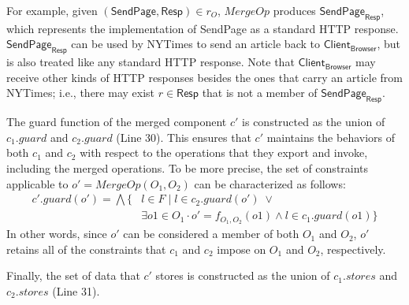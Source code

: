 For example, given $(\textsf{SendPage}, \textsf{Resp}) \in r_{O}$,
$MergeOp$ produces $\textsf{SendPage}_{\textsf{Resp}}$, which
represents the implementation of \textsf{SendPage} as a standard HTTP
response.  $\textsf{SendPage}_{\textsf{Resp}}$ can be used by
\textsf{NYTimes} to send an article back to
$\textsf{Client}_\textsf{Browser}$, but is also treated like any
standard HTTP response. Note that $\textsf{Client}_\textsf{Browser}$
may receive other kinds of HTTP responses besides the ones that carry
an article from \textsf{NYTimes}; i.e., there may exist $r \in
\textsf{Resp}$ that is not a member of $\textsf{SendPage}_{\textsf{Resp}}$.

The guard function of the merged component $c'$ is constructed
as the union of $c_{1}.guard$ and $c_{2}.guard$ (Line 30). This ensures that $c'$
maintains the behaviors of both $c_{1}$ and $c_{2}$ with respect to the
operations that they export and invoke, including the merged
operations. To be more precise, the set of constraints applicable to $o' =
MergeOp(O_{1}, O_{2})$ can be characterized as follows:
\begin{align*}
c'.guard(o') = \bigwedge \{& l \in F \;|\; l \in c_{2}.guard(o') \; \lor \\
&\exists o1 \in O_{1} 
\cdot o' = f_{O_{1}, O_{2}}(o1) \land l \in c_{1}.guard(o1) \} 
\end{align*}
In other words, since $o'$ can be considered a member of both $O_{1}$ and
$O_{2}$, $o'$ retains all of the constraints that $c_{1}$ and $c_{2}$ impose
on $O_{1}$ and $O_{2}$, respectively. 

Finally, the set of data that $c'$ stores is constructed as the union
of $c_{1}.stores$ and $c_{2}.stores$ (Line 31).




